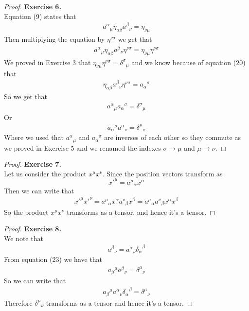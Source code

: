 \documentclass[11pt]{article}
\theoremstyle{definition}
\begin{document}
\cleardoublepage
\begin{proof}{\textbf{Exercise 6.}}\\
Equation (9) states that
\begin{align*}
    {a^\alpha}_\mu \eta_{\alpha\beta} {a^\beta}_\nu = \eta_{\nu\mu}
\end{align*}
Then multiplying the equation by $\eta^{\nu\sigma}$ we get that
\begin{align*}
    {a^\alpha}_\mu \eta_{\alpha\beta} {a^\beta}_\nu \eta^{\nu\sigma}
    = \eta_{\nu\mu} \eta^{\nu\sigma}
\end{align*}
We proved in Exercise 3 that
$\eta_{\nu\mu} \eta^{\nu\sigma} = {\delta^\sigma}_\mu$ and we know because of
equation (20) that
\begin{align*}
    \eta_{\alpha\beta} {a^\beta}_\nu \eta^{\nu\sigma}
    = {a_\alpha}^\sigma
\end{align*}
So we get that
\begin{align*}
    {a^\alpha}_\mu {a_\alpha}^\sigma = {\delta^\sigma}_\mu
\end{align*}
Or 
\begin{align*}
    {a_\alpha}^\mu {a^\alpha}_\nu = {\delta^\mu}_\nu
\end{align*}
Where we used that ${a^\alpha}_\mu$ and ${a_\alpha}^\sigma$ are inverses of
each other so they commute as we proved in Exercise 5 and we renamed the indexes
$\sigma \to \mu$ and $\mu \to \nu$.

\end{proof}

\cleardoublepage
\begin{proof}{\textbf{Exercise 7.}}\\
Let us consider the product $x^\mu x^\nu$. Since the position vectors
transform as
$$x'^\mu = {a^\mu}_\alpha x^\alpha$$
Then we can write that
\begin{align*}
    x'^\mu x'^\nu = {a^\mu}_\alpha x^\alpha {a^\nu}_\beta x^\beta
    = {a^\mu}_\alpha {a^\nu}_\beta x^\alpha x^\beta 
\end{align*}
So the product $x^\mu x^\nu$ transforms as a tensor, and hence it's a tensor.
\end{proof}

\begin{proof}{\textbf{Exercise 8.}}\\
We note that
\begin{align*}
    {a^\beta}_\nu = {a^\alpha}_\nu {\delta_\alpha}^\beta
\end{align*}
From equation (23) we have that
\begin{align*}
    {a_\beta}^\mu {a^\beta}_\nu = {\delta^\mu}_\nu
\end{align*}
So we can write that
\begin{align*}
    {a_\beta}^\mu {a^\alpha}_\nu {\delta_\alpha}^\beta = {\delta^\mu}_\nu
\end{align*}
Therefore ${\delta^\mu}_\nu$ transforms as a tensor and hence it's a tensor.
\end{proof}
\end{document}
